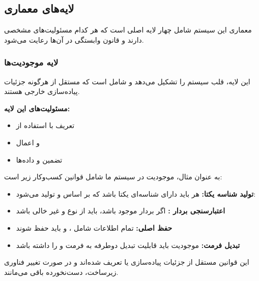 \subsection{لایه‌های معماری}

معماری این سیستم شامل چهار لایه اصلی است که هر کدام مسئولیت‌های مشخصی دارند و قانون وابستگی  در آن‌ها رعایت می‌شود.

\subsubsection{لایه موجودیت‌ها }

این لایه، قلب سیستم را تشکیل می‌دهد و شامل  است که مستقل از هرگونه جزئیات پیاده‌سازی خارجی هستند.

\noindent
\textbf{مسئولیت‌های این لایه:}
\begin{itemize}
    \item تعریف  با استفاده از 
    \item {} و اعمال 
    \item تضمین  و  داده‌ها
\end{itemize}

\noindent
به عنوان مثال، موجودیت  در سیستم ما شامل قوانین کسب‌وکار زیر است:

\begin{itemize}
    \item \textbf{تولید شناسه یکتا:} هر  باید دارای شناسه‌ای یکتا باشد که بر اساس  و  تولید می‌شود: 
    
    \item \textbf{اعتبارسنجی بردار :} اگر بردار  موجود باشد، باید از نوع  و غیر خالی باشد
    
    \item \textbf{حفظ  اصلی:} تمام اطلاعات  شامل ،  و  باید حفظ شوند
    
    \item \textbf{تبدیل فرمت:} موجودیت باید قابلیت تبدیل دوطرفه به فرمت  و  را داشته باشد
\end{itemize}

\noindent
این قوانین مستقل از جزئیات پیاده‌سازی  یا  تعریف شده‌اند و در صورت تغییر فناوری زیرساخت، دست‌نخورده باقی می‌مانند.


